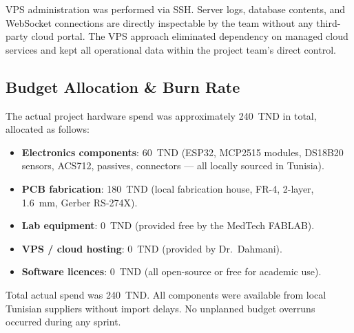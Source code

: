 VPS administration was performed via SSH. Server logs, database contents, and WebSocket connections are directly inspectable by the team without any third-party cloud portal. The VPS approach eliminated dependency on managed cloud services and kept all operational data within the project team's direct control.

\subsection{Budget Allocation \& Burn Rate}

The actual project hardware spend was approximately 240~TND in total, allocated as follows:

\begin{itemize}
    \item \textbf{Electronics components}: 60~TND (ESP32, MCP2515 modules, DS18B20 sensors, ACS712, passives, connectors — all locally sourced in Tunisia).
    \item \textbf{PCB fabrication}: 180~TND (local fabrication house, FR-4, 2-layer, 1.6~mm, Gerber RS-274X).
    \item \textbf{Lab equipment}: 0~TND (provided free by the MedTech FABLAB).
    \item \textbf{VPS / cloud hosting}: 0~TND (provided by Dr.\ Dahmani).
    \item \textbf{Software licences}: 0~TND (all open-source or free for academic use).
\end{itemize}

Total actual spend was 240~TND. All components were available from local Tunisian suppliers without import delays. No unplanned budget overruns occurred during any sprint.
